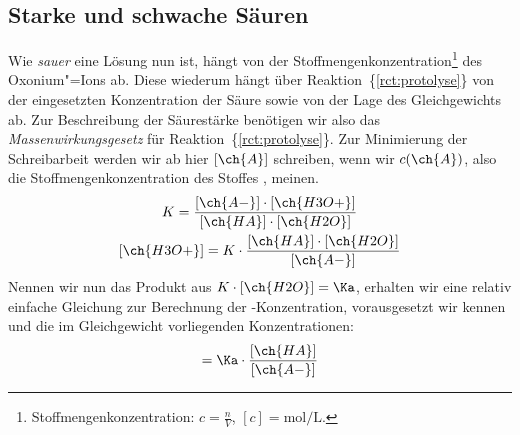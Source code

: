 \documentclass{scrartcl}
\newcommand*\rctref[1]{\{\ref{#1}\}}
\begin{document}
\subsection{Starke und schwache Säuren}
Wie \emph{sauer} eine Lösung nun ist, hängt von der
Stoffmengenkonzentration\footnote{Stoffmengenkonzentration: $c=\frac{n}{V}$,
  $[c]=\si{\mole\per\liter}$.} des Oxonium"=Ions ab.  Diese wiederum hängt
über Reaktion~\rctref{rct:protolyse} von der eingesetzten Konzentration der
Säure sowie von der Lage des Gleichgewichts ab.  Zur Beschreibung der
Säurestärke benötigen wir also das \emph{Massenwirkungsgesetz} für
Reaktion~\rctref{rct:protolyse}.  Zur Minimierung der Schreibarbeit werden wir
ab hier $[\ch{A}]$ schreiben, wenn wir $c(\ch{A})$, also die
Stoffmengenkonzentration des Stoffes , meinen.
\begin{gather}
  K =
    \frac
      { [\ch{A-}] \cdot [\ch{H3O+}] }
      { [\ch{HA}] \cdot [\ch{H2O}] } \label{eq:protolyse_mwg} \\
  [\ch{H3O+}] =
    K \cdot \frac{ [\ch{HA}] \cdot [\ch{H2O}] }{ [\ch{A-}] }
\end{gather}
Nennen wir nun das Produkt aus $K \cdot [\ch{H2O}] = \Ka$, erhalten wir eine
relativ einfache Gleichung zur Berechnung der -Konzentration,
vorausgesetzt wir kennen \Ka und die im Gleichgewicht vorliegenden
Konzentrationen:
\begin{equation}
  [\ch{H3O+}] = \Ka \cdot \frac{ [\ch{HA}] }{ [\ch{A-}] } \label{eq:cHtO_aus_Ks}
\end{equation}
\end{document}

